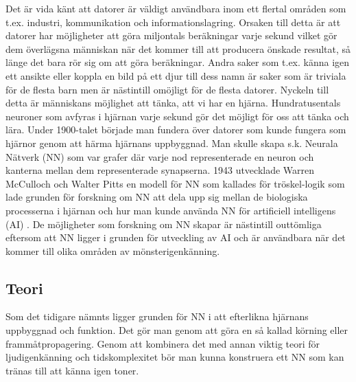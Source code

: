\documentclass[a4paper,10pt]{article}
\begin{document}
Det är vida känt att datorer är väldigt användbara inom ett flertal områden som t.ex. industri, kommunikation och informationslagring. Orsaken till detta är att datorer har möjligheter att göra miljontals beräkningar varje sekund vilket gör dem överlägsna människan när det kommer till att producera önskade resultat, så länge det bara rör sig om att göra beräkningar. Andra saker som t.ex. känna igen ett ansikte eller koppla en bild på ett djur till dess namn är saker som är triviala för de flesta barn men är nästintill omöjligt för de flesta datorer. Nyckeln till detta är människans möjlighet att tänka, att vi har en hjärna. Hundratusentals neuroner som avfyras i hjärnan varje sekund gör det möjligt för oss att tänka och lära. Under 1900-talet började man fundera över datorer som kunde fungera som hjärnor genom att härma hjärnans uppbyggnad. Man skulle skapa s.k. Neurala Nätverk (NN) som var grafer där varje nod representerade en neuron och kanterna mellan dem representerade synapserna. 1943 utvecklade Warren McCulloch och Walter Pitts en modell för NN som kallades för tröskel-logik som lade grunden för forskning om NN att dela upp sig mellan de biologiska processerna i hjärnan och hur man kunde använda NN för artificiell intelligens (AI) \autocite{NNhistory}. De möjligheter som forskning om NN skapar är nästintill outtömliga eftersom att NN ligger i grunden för utveckling av AI och är användbara när det kommer till olika områden av mönsterigenkänning.


\subsection{Teori}

Som det tidigare nämnts ligger grunden för NN i att efterlikna hjärnans uppbyggnad och funktion. Det gör man genom att göra en så kallad körning eller frammåtpropagering. Genom att kombinera det med annan viktig teori för ljudigenkänning och tidskomplexitet bör man kunna konstruera ett NN som kan tränas till att känna igen toner. 
\end{document}
